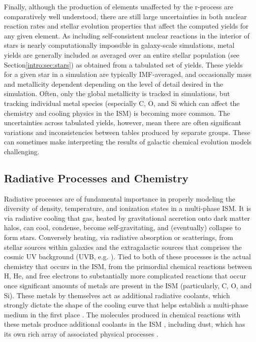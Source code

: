 Finally, although the production of elements unaffected by the r-process are comparatively well understood, there are still large uncertainties in both nuclear reaction rates and stellar evolution properties that affect the computed yields for any given element. As including self-consistent nuclear reactions in the interior of stars is nearly computationally impossible in galaxy-scale simulations, metal yields are generally included as averaged over an entire stellar population (see Section\ref{intro:sec:stars}) as obtained from a tabulated set of yields. These yields for a given star in a simulation are typically IMF-averaged, and occasionally mass and metallicity dependent depending on the level of detail desired in the simulation. Often, only the global metallicity is tracked in simulations, but tracking individual metal species (especially C, O, and Si which can affect the chemistry and cooling physics in the ISM) is becoming more common. The uncertainties across tabulated yields, however, mean there are often significant variations and inconsistencies between tables produced by separate groups. These can sometimes make interpreting the results of galactic chemical evolution models challenging.

\subsection{Radiative Processes and Chemistry}
\label{intro:sec:cooling}

Radiative processes are of fundamental importance in properly modeling the diversity of density, temperature, and ionization states in a multi-phase ISM. It is via radiative cooling that gas, heated by gravitational accretion onto dark matter halos, can cool, condense, become self-gravitating, and (eventually) collapse to form stars. Conversely heating, via radiative absorption or scatterings, from stellar sources within galaxies and the extragalactic sources that comprises the cosmic UV background (UVB, e.g. \cite{HM2001,HM2012,FG2011}). Tied to both of these processes is the actual chemistry that occurs in the ISM, from the primordial chemical reactions between H, He, and free electrons to substantially more complicated reactions that occur once significant amounts of metals are present in the ISM (particularly, C, O, and Si). These metals by themselves act as additional radiative coolants, which strongly dictate the shape of the cooling curve that helps establish a multi-phase medium in the first place \citep[e.g.][]{McKeeOstriker1977}. The molecules produced in chemical reactions with these metals produce additional coolants in the ISM \citep{HollenbachMcKee1979}, including dust, which has its own rich array of associated physical processes \citep{Omukai2000,Omukai2005,Draine2011}.

